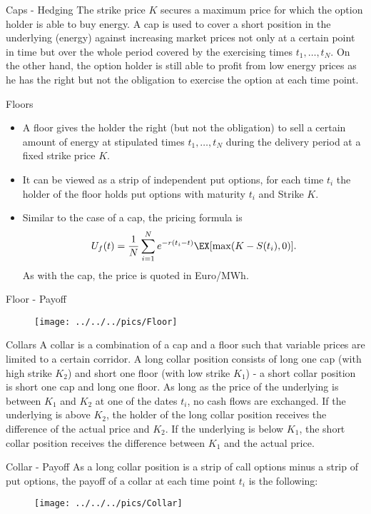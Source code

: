 {Caps - Hedging}
The strike price $K$ secures a maximum price for which the option holder is able to buy energy. A cap is used to cover a short position in the underlying (energy) against
increasing market prices not only at a certain point in time but over the whole period covered by the exercising times $t_1,\ldots,t_N$.
On the other hand, the option holder is still able to profit from low energy prices as he has the right but not the obligation to exercise the option at each time point.




{Floors}
\begin{itemize}
\item<1-> A floor gives the holder the right (but not the
obligation) to sell a certain amount of energy at stipulated times
$t_1,\ldots,t_N$ during the delivery period at a fixed strike
price $K$.
\item<2-> It can be viewed as a strip of
independent put options, for each time $t_i$ the holder of the floor holds put options with maturity $t_i$ and Strike $K$.
\item<3->
Similar to the case of a cap, the pricing formula is
$$U_f(t)=\frac{1}{N}\sum_{i=1}^Ne^{-r(t_i-t)}\EX[\max(K-S(t_i),0)].$$
As with the cap, the price is quoted in Euro/MWh.
\end{itemize}



{Floor - Payoff}
\begin{figure}
	\centering
		\texttt{[image: ../../../pics/Floor]}
	\label{fig:Floor}
\end{figure}





{Collars}
A collar is a combination of a cap and a floor such that variable prices are limited to a certain corridor. A long collar position consists of long one cap (with high strike $K_2$) and short one floor (with low strike $K_1$) - a short collar position is short one cap and long one floor. As long as the price of the underlying is between $K_1$ and $K_2$ at one of the dates $t_i$, no cash flows are exchanged. If the underlying is above $K_2$, the holder of the long collar position receives the difference of the actual price and $K_2$. If the underlying is below $K_1$, the short collar position receives the difference between $K_1$ and the actual price.



{Collar - Payoff}
As a long collar position is a strip of call options minus a strip of put options, the payoff of a collar at each time point $t_i$ is the following:
\begin{figure}
	\centering
		\texttt{[image: ../../../pics/Collar]}
	\label{fig:Collar}
\end{figure}




